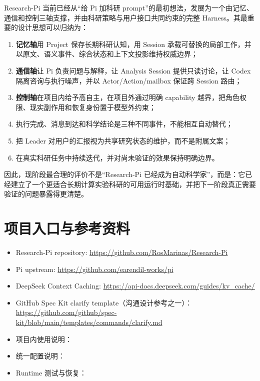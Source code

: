 \documentclass[UTF8,11pt,a4paper,fontset=fandol]{ctexart}
\newcommand{\term}[1]{\textbf{#1}}
\begin{document}
Research-Pi 当前已经从“给 Pi 加科研 prompt”的最初想法，发展为一个由记忆、通信和控制三轴支撑，并由科研策略与用户接口共同约束的完整 Harness。其最重要的设计思想可以归纳为：

\begin{enumerate}
  \item \term{记忆轴}用 Project 保存长期科研认知，用 Session 承载可替换的局部工作，并以原文、语义事件、综合状态和上下文投影维持权威边界；
  \item \term{通信轴}让 Pi 负责问题与解释，让 Analysis Session 提供只读讨论，让 Codex 隔离咨询与执行噪声，并以 Actor/Action/mailbox 保证跨 Session 路由；
  \item \term{控制轴}在项目内给予高自主，在项目外通过明确 capability 越界，把角色权限、现实副作用和恢复身份置于模型外约束；
  \item 执行完成、消息到达和科学结论是三种不同事件，不能相互自动替代；
  \item 把 Leader 对用户的汇报视为共享研究状态的维护，而不是附属文案；
  \item 在真实科研任务中持续迭代，并对尚未验证的效果保持明确边界。
\end{enumerate}

因此，现阶段最合理的评价不是“Research-Pi 已经成为自动科学家”，而是：它已经建立了一个更适合长期计算实验科研的可用运行时基础，并把下一阶段真正需要验证的问题暴露得更清楚。

\section*{项目入口与参考资料}

\begin{itemize}
  \item Research-Pi repository: \url{https://github.com/RosMarinas/Research-Pi}
  \item Pi upstream: \url{https://github.com/earendil-works/pi}
  \item DeepSeek Context Caching: \url{https://api-docs.deepseek.com/guides/kv_cache/}
  \item GitHub Spec Kit clarify template（沟通设计参考之一）：\url{https://github.com/github/spec-kit/blob/main/templates/commands/clarify.md}
  \item 项目内使用说明：
  \item 统一配置说明：
  \item Runtime 测试与恢复：
\end{itemize}
\end{document}
